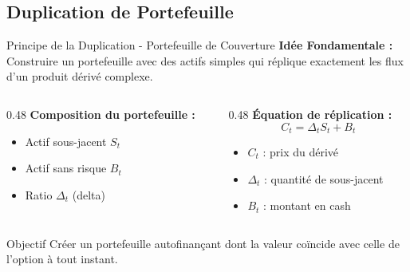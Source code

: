 \documentclass[aspectratio=169, 10pt]{beamer}
\begin{document}
\subsection{Duplication de Portefeuille}

\begin{frame}{Principe de la Duplication - Portefeuille de Couverture}
    \textbf{Idée Fondamentale :} Construire un portefeuille avec des actifs simples qui réplique exactement les flux d'un produit dérivé complexe.
    
    \vspace{0.3cm}
    \begin{columns}[T]
        \begin{column}{0.48\textwidth}
            \textbf{Composition du portefeuille :}
            \begin{itemize}
                \item Actif sous-jacent $S_t$
                \item Actif sans risque $B_t$
                \item Ratio $\Delta_t$ (delta)
            \end{itemize}
        \end{column}
        \begin{column}{0.48\textwidth}
            \textbf{Équation de réplication :}
            $$C_t = \Delta_t S_t + B_t$$
            \begin{itemize}
                \item $C_t$ : prix du dérivé
                \item $\Delta_t$ : quantité de sous-jacent
                \item $B_t$ : montant en cash
            \end{itemize}
        \end{column}
    \end{columns}
    
    \vspace{0.3cm}
    \begin{block}{Objectif}
    Créer un portefeuille autofinançant dont la valeur coïncide avec celle de l'option à tout instant.
    \end{block}
\end{frame}
\end{document}
